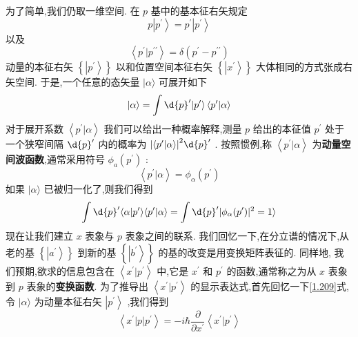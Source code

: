 \documentclass[lang=cn,newtx,10pt,scheme=chinese,thmcnt=section]{elegantbook}
\begin{document}
为了简单,我们仍取一维空间. 在 $p$ 基中的基本征右矢规定
\begin{equation}
	p\left| {p}^{\prime }\right\rangle = {p}^{\prime }\left| {p}^{\prime }\right\rangle
\end{equation}
以及
\begin{equation}
	\left\langle {{p}^{\prime } | {p}^{\prime \prime }}\right\rangle = \delta \left( {{p}^{\prime } - {p}^{\prime \prime }}\right)
\end{equation}
动量的本征右矢 $\left\{ \left| {p}^{\prime }\right\rangle \right\}$ 以和位置空间本征右矢 $\left\{ \left| {x}^{\prime }\right\rangle \right\}$ 大体相同的方式张成右矢空间. 于是,一个任意的态矢量 $|\alpha \rangle$ 可展开如下
\begin{equation}
	| {\alpha \rangle = \int \d{p}^{\prime }}| {p}^{\prime }\rangle \left\langle {{p}^{\prime } | \alpha }\right\rangle
\end{equation}
对于展开系数 $\left\langle {{p}^{\prime } | \alpha }\right\rangle$ 我们可以给出一种概率解释,测量 $p$ 给出的本征值 ${p}^{\prime }$ 处于一个狭窄间隔 $\d{p}^{\prime }$ 内的概率为 ${\left| \left\langle {p}^{\prime } | \alpha \right\rangle \right| }^{2}\d{p}^{\prime }$ . 按照惯例,称 $\left\langle {{p}^{\prime } | \alpha }\right\rangle$ 为\textbf{动量空间波函数},通常采用符号 ${\phi }_{a}\left( {p}^{\prime }\right)$ :
\begin{equation}
	\left\langle {{p}^{\prime } | \alpha }\right\rangle = {\phi }_{\alpha }\left( {p}^{\prime }\right) 
\end{equation}
如果 $|\alpha \rangle$ 已被归一化了,则我们得到
\begin{equation}
	\int \d{p}^{\prime }\langle {\alpha | {{p}^{\prime }\rangle \langle {{p}^{\prime } | \alpha }\rangle = \int \d{p}^{\prime }}| {\phi }_{\alpha }( {p}^{\prime }) {| }^{2} = 1}\rangle
\end{equation}
现在让我们建立 $x$ 表象与 $p$ 表象之间的联系. 我们回忆一下,在分立谱的情况下,从老的基 $\left\{ \left| {a}^{\prime }\right\rangle \right\}$ 到新的基 $\left\{ \left| {b}^{\prime }\right\rangle \right\}$ 的基的改变是用变换矩阵表征的. 同样地, 我们预期,欲求的信息包含在 $\left\langle {{x}^{\prime } | {p}^{\prime }}\right\rangle$ 中,它是 ${x}^{\prime }$ 和 ${p}^{\prime }$ 的函数,通常称之为从 $x$ 表象到 $p$ 表象的\textbf{变换函数}. 为了推导出 $\left\langle {{x}^{\prime } | {p}^{\prime }}\right\rangle$ 的显示表达式,首先回忆一下\ref{1.209}式, 令 $|\alpha \rangle$ 为动量本征右矢 $\left| {p}^{\prime }\right\rangle$ ,我们得到
\begin{equation}
	\left\langle {{x}^{\prime }\left| p\right| {p}^{\prime }}\right\rangle = - i\hbar \frac{\partial }{\partial {x}^{\prime }}\left\langle {{x}^{\prime } | {p}^{\prime }}\right\rangle
\end{equation}
\end{document}
